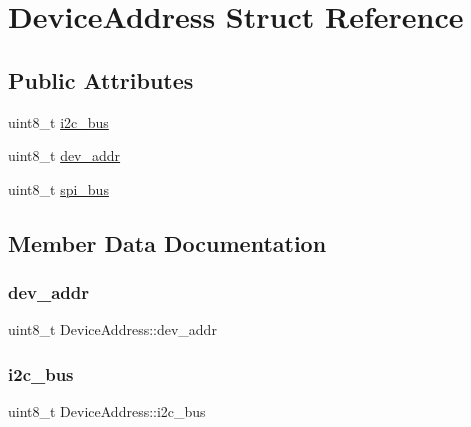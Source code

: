 \hypertarget{structDeviceAddress}{}\section{Device\+Address Struct Reference}
\label{structDeviceAddress}
\subsection*{Public Attributes}
\begin{DoxyCompactItemize}
\item 
uint8\+\_\+t \hyperlink{structDeviceAddress_aa5ae1627b9690a177d9b46787a0f9eef}{i2c\+\_\+bus}
\item 
uint8\+\_\+t \hyperlink{structDeviceAddress_a63153bb919e8b5c48ed2d8bef569279d}{dev\+\_\+addr}
\item 
uint8\+\_\+t \hyperlink{structDeviceAddress_a729177b7e8fc025a1be314e9470ef78f}{spi\+\_\+bus}
\end{DoxyCompactItemize}


\subsection{Member Data Documentation}
\mbox{\label{structDeviceAddress_a63153bb919e8b5c48ed2d8bef569279d}} 
\subsubsection{\texorpdfstring{dev\+\_\+addr}{dev\_addr}}
{\footnotesize\ttfamily uint8\+\_\+t Device\+Address\+::dev\+\_\+addr}

\mbox{\label{structDeviceAddress_aa5ae1627b9690a177d9b46787a0f9eef}} 
\subsubsection{\texorpdfstring{i2c\+\_\+bus}{i2c\_bus}}
{\footnotesize\ttfamily uint8\+\_\+t Device\+Address\+::i2c\+\_\+bus}

\mbox{\label{structDeviceAddress_a729177b7e8fc025a1be314e9470ef78f}} 
